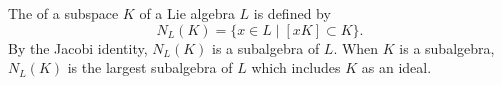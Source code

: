 The  of a subspace $K$ of a Lie algebra $L$ is defined by
$$N_L(K) = \{x \in L \mid [xK] \subset K\}.$$
By the Jacobi identity, $N_L(K)$ is a subalgebra of $L$. When $K$ is a subalgebra, $N_L(K)$ is the largest subalgebra of $L$ which includes $K$ as an ideal.
